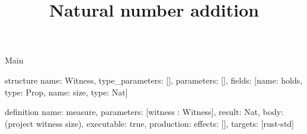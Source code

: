 \begin{lexlean}{Main}
\title{Natural number addition}
\begin{semanticmodule}
structure{
  name: Witness,
  type_parameters: [],
  parameters: [],
  fields: [{name: holds, type: Prop}, {name: size, type: Nat}]
}

definition{
  name: measure,
  parameters: [witness : Witness],
  result: Nat,
  body: (project witness size),
  executable: true,
  production: {effects: [], targets: [rust-std]}
}
\end{semanticmodule}
\end{lexlean}
